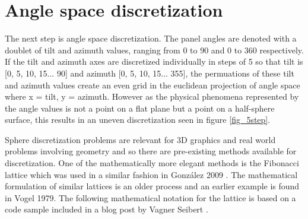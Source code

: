 




\newpage
\section{Angle space discretization}\label{angle_space_discretization}
The next step is angle space discretization. The panel angles are denoted with a doublet of tilt and azimuth values, ranging from 0 to 90 and 0 to 360 respectively. If the tilt and azimuth axes are discretized individually in steps of 5 so that tilt is [0, 5, 10, 15... 90] and azimuth [0, 5, 10, 15... 355], the permuations of these tilt and azimuth values create an even grid in the euclidean projection of angle space where x = tilt, y = azimuth. However as the physical phenomena represented by the angle values is not a point on a flat plane but a point on a half-sphere surface, this results in an uneven discretization seen in figure \ref{fig_5step}. 

Sphere discretization problems are relevant for 3D graphics and real world problems involving geometry and so there are pre-existing methods available for discretization. One of the mathematically more elegant methods is the Fibonacci lattice which was used in a similar fashion in González 2009 \cite{Gonzlez}. The mathematical formulation of similar lattices is an older process and an earlier example is found in Vogel 1979\cite{fibolat_old}. The following mathematical notation for the lattice is based on a code sample included in a blog post by Vagner Seibert \cite{medium_fibolat_equation}.




